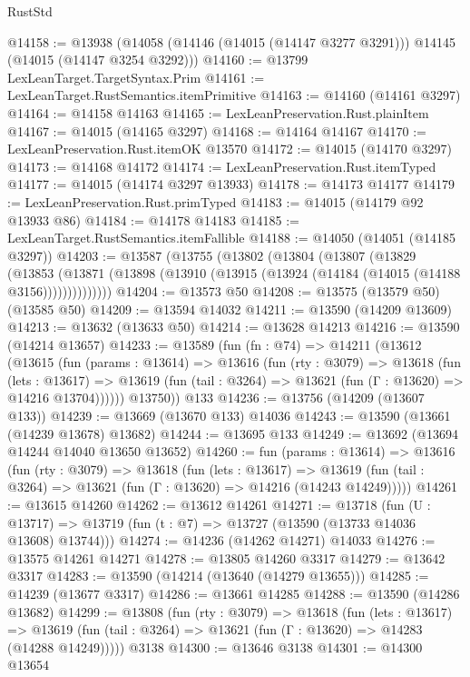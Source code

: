 \begin{lexlean}{RustStd}
\begin{coremodule}
@14158 := @13938
    (@14058 (@14146 (@14015 (@14147 @3277 @3291))) @14145 (@14015 (@14147 @3254 @3292)))
@14160 := @13799 LexLeanTarget.TargetSyntax.Prim
@14161 := LexLeanTarget.RustSemantics.itemPrimitive
@14163 := @14160 (@14161 @3297)
@14164 := @14158 @14163
@14165 := LexLeanPreservation.Rust.plainItem
@14167 := @14015 (@14165 @3297)
@14168 := @14164 @14167
@14170 := LexLeanPreservation.Rust.itemOK @13570
@14172 := @14015 (@14170 @3297)
@14173 := @14168 @14172
@14174 := LexLeanPreservation.Rust.itemTyped
@14177 := @14015 (@14174 @3297 @13933)
@14178 := @14173 @14177
@14179 := LexLeanPreservation.Rust.primTyped
@14183 := @14015 (@14179 @92 @13933 @86)
@14184 := @14178 @14183
@14185 := LexLeanTarget.RustSemantics.itemFallible
@14188 := @14050 (@14051 (@14185 @3297))
@14203 := @13587
    (@13755
      (@13802
        (@13804
          (@13807
            (@13829
              (@13853
                (@13871 (@13898 (@13910 (@13915 (@13924 (@14184 (@14015 (@14188 @3156))))))))))))))
@14204 := @13573 @50
@14208 := @13575 (@13579 @50) (@13585 @50)
@14209 := @13594 @14032
@14211 := @13590 (@14209 @13609)
@14213 := @13632 (@13633 @50)
@14214 := @13628 @14213
@14216 := @13590 (@14214 @13657)
@14233 := @13589
    (fun (fn : @74) =>
    @14211
      (@13612
        (@13615
          (fun (params : @13614) =>
          @13616
            (fun (rty : @3079) =>
            @13618
              (fun (lets : @13617) =>
              @13619 (fun (tail : @3264) => @13621 (fun (Γ : @13620) => @14216 @13704))))))
        @13750))
    @133
@14236 := @13756 (@14209 (@13607 @133))
@14239 := @13669 (@13670 @133) @14036
@14243 := @13590 (@13661 (@14239 @13678) @13682)
@14244 := @13695 @133
@14249 := @13692 (@13694 @14244 @14040 @13650 @13652)
@14260 := fun (params : @13614) =>
  @13616
    (fun (rty : @3079) =>
    @13618
      (fun (lets : @13617) =>
      @13619 (fun (tail : @3264) => @13621 (fun (Γ : @13620) => @14216 (@14243 @14249)))))
@14261 := @13615 @14260
@14262 := @13612 @14261
@14271 := @13718
    (fun (U : @13717) => @13719 (fun (t : @7) => @13727 (@13590 (@13733 @14036 @13608) @13744)))
@14274 := @14236 (@14262 @14271) @14033
@14276 := @13575 @14261 @14271
@14278 := @13805 @14260 @3317
@14279 := @13642 @3317
@14283 := @13590 (@14214 (@13640 (@14279 @13655)))
@14285 := @14239 (@13677 @3317)
@14286 := @13661 @14285
@14288 := @13590 (@14286 @13682)
@14299 := @13808
    (fun (rty : @3079) =>
    @13618
      (fun (lets : @13617) =>
      @13619 (fun (tail : @3264) => @13621 (fun (Γ : @13620) => @14283 (@14288 @14249)))))
    @3138
@14300 := @13646 @3138
@14301 := @14300 @13654

\end{coremodule}
\end{lexlean}
